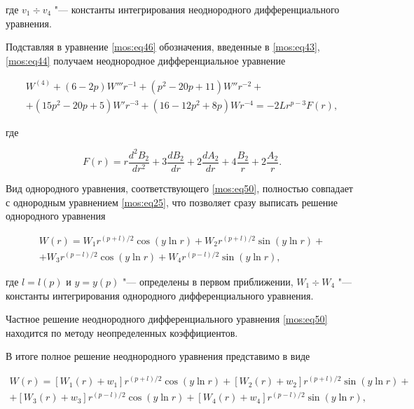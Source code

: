 где $v_1 \div v_4$  "--- константы интегрирования неоднородного дифференциального уравнения.



Подставляя в уравнение  \eqref{mos:eq46}  обозначения, введенные в \eqref{mos:eq43}, \eqref{mos:eq44}  получаем неоднородное дифференциальное уравнение

\begin{multline}

\label{mos:eq50}

W^{(4)}+(6-2p)W'''r^{-1}+(p^2-20p+11)W'' r^{-2}+\\+

(15p^2-20p+5)W' r^{-3}+(16-12p^2+8p)Wr^{-4}=-2Lr^{p-3}F(r),

\end{multline}

где

\begin{equation*}

F(r)=r\frac{d^2B_2}{dr^2}+3\frac{dB_2}{dr}+2\frac{dA_2}{dr}+4\frac{B_2}{r}+2\frac{A_2}{r}.

\end{equation*}

Вид однородного уравнения, соответствующего  \eqref{mos:eq50}, полностью совпадает с однородным уравнением  \eqref{mos:eq25}, что позволяет сразу выписать решение однородного уравнения

 \begin{multline}

\label{mos:eq51}

W(r)=W_{1} r^{(p+l)/2}\cos(y\ln r)+W_{2} r^{(p+l)/2}\sin(y\ln r)+\\+W_{3} r^{(p-l)/2}\cos(y\ln r)+W_{4} r^{(p-l)/2}\sin(y\ln r),

\end{multline}

где $l=l(p)$  и  $y=y(p)$ "--- определены в первом приближении, $W_1\div W_4$  "--- константы интегрирования однородного дифференциального уравнения.





Частное решение неоднородного дифференциального уравнения \eqref{mos:eq50} находится по методу неопределенных коэффициентов.

В итоге полное решение неоднородного уравнения  представимо в виде

\begin{multline}

\label{mos:eq52}

W(r)=[W_{1}(r)+w_1] r^{(p+l)/2}\cos(y\ln r)+[W_{2}(r)+w_2] r^{(p+l)/2}\sin(y\ln r)+\\+[W_{3}(r)+w_3] r^{(p-l)/2}\cos(y\ln r)+[W_{4}(r)+w_4] r^{(p-l)/2}\sin(y\ln r),

\end{multline}

